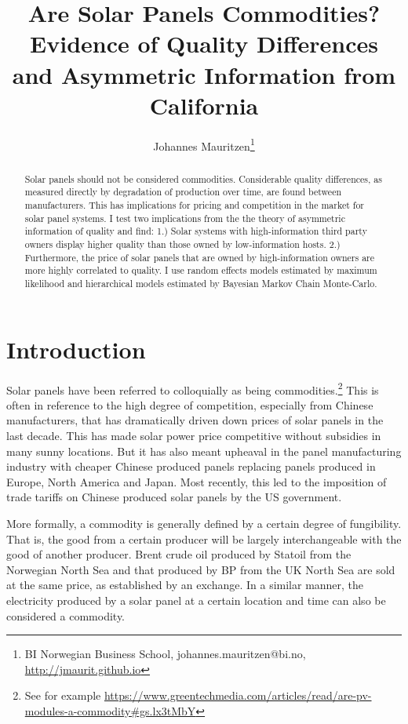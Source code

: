 \documentclass[a4paper]{article}
\title{Are Solar Panels Commodities? Evidence of Quality Differences and Asymmetric Information from California}
\author{Johannes Mauritzen\thanks{BI Norwegian Business School, johannes.mauritzen@bi.no, \url{http://jmaurit.github.io}}}
\begin{document}
\maketitle

\begin{abstract}
Solar panels should not be considered commodities. Considerable quality differences, as measured directly by degradation of production over time, are found between manufacturers. This has implications for pricing and competition in the market for solar panel systems. I test two implications from the the theory of asymmetric information of quality and find: 1.) Solar systems with high-information third party owners display higher quality than those owned by low-information hosts. 2.) Furthermore, the price of solar panels that are owned by high-information owners are more highly correlated to quality. I use random effects models estimated by maximum likelihood and hierarchical models estimated by Bayesian Markov Chain Monte-Carlo.
\end{abstract}

\newpage{}

\section{Introduction}

Solar panels have been referred to colloquially as being commodities.\footnote{See for example \url{https://www.greentechmedia.com/articles/read/are-pv-modules-a-commodity\#gs.lx3tMbY}} This is often in reference to the high degree of competition, especially from Chinese manufacturers, that has dramatically driven down prices of solar panels in the last decade. This has made solar power price competitive without subsidies in many sunny locations. But it has also meant upheaval in the panel manufacturing industry with cheaper Chinese produced panels replacing panels produced in Europe, North America and Japan. Most recently, this led to the imposition of trade tariffs on Chinese produced solar panels by the US government.

More formally, a commodity is generally defined by a certain degree of fungibility. That is, the good from a certain producer will be largely interchangeable with the good of another producer. Brent crude oil produced by Statoil from the Norwegian North Sea and that produced by BP from the UK North Sea are sold at the same price, as established by an exchange. In a similar manner, the electricity produced by a solar panel at a certain location and time can also be considered a commodity.
\end{document}
